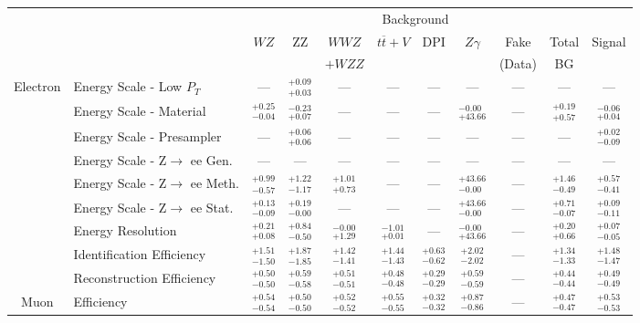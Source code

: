 \small\renewcommand{\tabcolsep}{1pt}
\begin{tabular}{|cl||ccccccc|c||c|}
\hline
 & & \multicolumn{8}{c||}{Background} & \\ 
 & & $WZ$ & ZZ & $WWZ$ & $t\overline{t}+V$ & DPI & $Z\gamma$ & Fake & Total & Signal\\ 
 & & &  & $+WZZ$ &  &  &  & (Data) & BG & \\ 
\hline\hline
\multirow{9}{*}{Electron}
&Energy Scale - Low $P_{T}$ & --- &  $^{+0.09}_{+0.03}$  & --- & --- & --- & --- & --- & --- & ---\\ 
\cline{2-11}
&Energy Scale - Material &  $^{+0.25}_{-0.04}$  &  $^{-0.23}_{+0.07}$  & --- & --- & --- &  $^{-0.00}_{+43.66}$  & --- &  $^{+0.19}_{+0.57}$  &  $^{-0.06}_{+0.04}$ \\ 
\cline{2-11}
&Energy Scale - Presampler & --- &  $^{+0.06}_{+0.06}$  & --- & --- & --- & --- & --- & --- &  $^{+0.02}_{-0.09}$ \\ 
\cline{2-11}
&Energy Scale - Z$\rightarrow$ ee Gen. & --- & --- & --- & --- & --- & --- & --- & --- & ---\\ 
\cline{2-11}
&Energy Scale - Z$\rightarrow$ ee Meth. &  $^{+0.99}_{-0.57}$  &  $^{+1.22}_{-1.17}$  &  $^{+1.01}_{+0.73}$  & --- & --- &  $^{+43.66}_{-0.00}$  & --- &  $^{+1.46}_{-0.49}$  &  $^{+0.57}_{-0.41}$ \\ 
\cline{2-11}
&Energy Scale - Z$\rightarrow$ ee Stat. &  $^{+0.13}_{-0.09}$  &  $^{+0.19}_{-0.00}$  & --- & --- & --- &  $^{+43.66}_{-0.00}$  & --- &  $^{+0.71}_{-0.07}$  &  $^{+0.09}_{-0.11}$ \\ 
\cline{2-11}
&Energy Resolution &  $^{+0.21}_{+0.08}$  &  $^{+0.84}_{-0.50}$  &  $^{-0.00}_{+1.29}$  &  $^{-1.01}_{+0.01}$  & --- &  $^{-0.00}_{+43.66}$  & --- &  $^{+0.20}_{+0.66}$  &  $^{+0.07}_{-0.05}$ \\ 
\cline{2-11}
&Identification Efficiency &  $^{+1.51}_{-1.50}$  &  $^{+1.87}_{-1.85}$  &  $^{+1.42}_{-1.41}$  &  $^{+1.44}_{-1.43}$  &  $^{+0.63}_{-0.62}$  &  $^{+2.02}_{-2.02}$  & --- &  $^{+1.34}_{-1.33}$  &  $^{+1.48}_{-1.47}$ \\ 
\cline{2-11}
&Reconstruction Efficiency &  $^{+0.50}_{-0.50}$  &  $^{+0.59}_{-0.58}$  &  $^{+0.51}_{-0.51}$  &  $^{+0.48}_{-0.48}$  &  $^{+0.29}_{-0.29}$  &  $^{+0.59}_{-0.59}$  & --- &  $^{+0.44}_{-0.44}$  &  $^{+0.49}_{-0.49}$ \\ 
\hline
\multirow{4}{*}{Muon}
&Efficiency &  $^{+0.54}_{-0.54}$  &  $^{+0.50}_{-0.50}$  &  $^{+0.52}_{-0.52}$  &  $^{+0.55}_{-0.55}$  &  $^{+0.32}_{-0.32}$  &  $^{+0.87}_{-0.86}$  & --- &  $^{+0.47}_{-0.47}$  &  $^{+0.53}_{-0.53}$ \\ 

\end{tabular}

